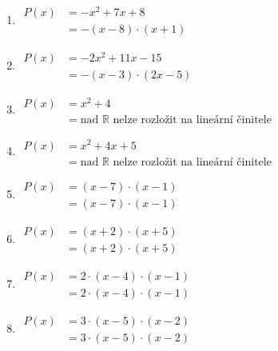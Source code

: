 \documentclass[11pt,a4paper]{article}
\begin{document}
\begin{enumerate}[label={},itemsep=9pt]
\item[\textbf{C015}] \(\displaystyle \begin{aligned}P(x)&=- x^{2} + 7x + 8\\ &= - \left(x - 8\right) \cdot \left(x + 1\right)\end{aligned}\)\par
\item[\textbf{C016}] \(\displaystyle \begin{aligned}P(x)&=- 2x^{2} + 11x - 15\\ &= - \left(x - 3\right) \cdot \left(2x - 5\right)\end{aligned}\)\par
\item[\textbf{C017}] \(\displaystyle \begin{aligned}P(x)&=x^{2} + 4\\ &= \text{nad }\mathbb R\text{ nelze rozložit na lineární činitele}\end{aligned}\)\par
\item[\textbf{C018}] \(\displaystyle \begin{aligned}P(x)&=x^{2} + 4x + 5\\ &= \text{nad }\mathbb R\text{ nelze rozložit na lineární činitele}\end{aligned}\)\par
\item[\textbf{C019}] \(\displaystyle \begin{aligned}P(x)&=\left(x - 7\right) \cdot \left(x - 1\right)\\ &= \left(x - 7\right) \cdot \left(x - 1\right)\end{aligned}\)\par
\item[\textbf{C020}] \(\displaystyle \begin{aligned}P(x)&=\left(x + 2\right) \cdot \left(x + 5\right)\\ &= \left(x + 2\right) \cdot \left(x + 5\right)\end{aligned}\)\par
\item[\textbf{C021}] \(\displaystyle \begin{aligned}P(x)&=2 \cdot \left(x - 4\right) \cdot \left(x - 1\right)\\ &= 2 \cdot \left(x - 4\right) \cdot \left(x - 1\right)\end{aligned}\)\par
\item[\textbf{C022}] \(\displaystyle \begin{aligned}P(x)&=3 \cdot \left(x - 5\right) \cdot \left(x - 2\right)\\ &= 3 \cdot \left(x - 5\right) \cdot \left(x - 2\right)\end{aligned}\)\par

\end{enumerate}
\end{document}
